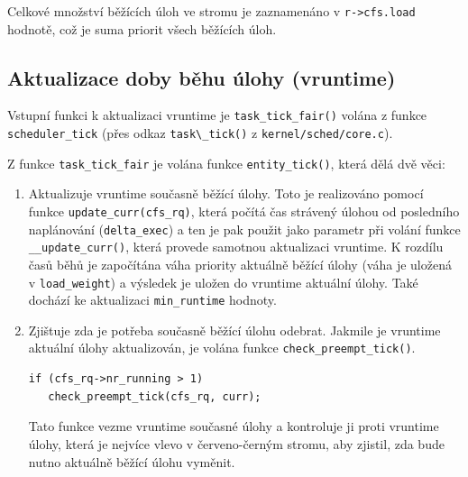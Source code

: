 \documentclass[a4paper,12pt]{article}
\begin{document}
Celkové množství běžících úloh ve stromu je zaznamenáno v \verb#r->cfs.load# hodnotě, což je suma priorit všech běžících úloh.

\subsection{Aktualizace doby běhu úlohy (vruntime)}

Vstupní funkci k aktualizaci vruntime je \verb#task_tick_fair()# volána z funkce \verb#scheduler_tick# (přes odkaz \verb#task\_tick()# z \verb#kernel/sched/core.c#). 

%
%
%
%
%

Z funkce \verb#task_tick_fair# je volána funkce \verb#entity_tick()#, která dělá dvě věci: 
\begin{enumerate}
\item Aktualizuje vruntime současně běžící úlohy. Toto je realizováno pomocí funkce \verb#update_curr(cfs_rq)#, která  počítá čas strávený úlohou od posledního naplánování (\verb#delta_exec#) a ten je pak použit jako parametr při volání funkce \verb#__update_curr()#, která provede samotnou aktualizaci vruntime. K rozdílu časů běhů je započítána váha priority aktuálně běžící úlohy (váha je uložená v \verb#load_weight#) a výsledek je uložen do vruntime aktuální úlohy. Také dochází ke aktualizaci \verb#min_runtime# hodnoty. 
\item Zjištuje zda je potřeba současně běžící úlohu odebrat. Jakmile je vruntime aktuální úlohy aktualizován, je volána funkce \verb#check_preempt_tick()#. 
\begin{verbatim}
if (cfs_rq->nr_running > 1)
   check_preempt_tick(cfs_rq, curr);
\end{verbatim}
Tato funkce vezme vruntime současné úlohy a kontroluje ji proti vruntime úlohy, která je nejvíce vlevo v červeno-černým stromu, aby zjistil, zda bude nutno aktuálně běžící úlohu vyměnit.
\end{enumerate}
\end{document}
